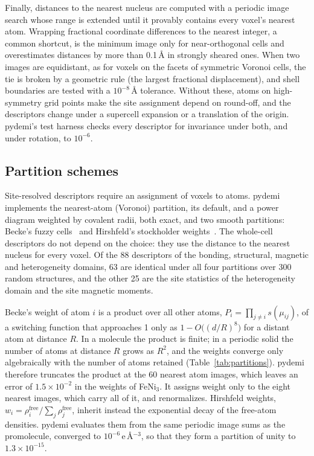 \documentclass[11pt,a4paper]{article}
\begin{document}
Finally, distances to the nearest nucleus are computed with a periodic image
search whose range is extended until it provably contains every voxel's
nearest atom. Wrapping fractional coordinate differences to the nearest
integer, a common shortcut, is the minimum image only for near-orthogonal
cells and overestimates distances by more than 0.1\,\AA{} in strongly sheared
ones. When two images are equidistant, as for voxels on the facets of
symmetric Voronoi cells, the tie is broken by a geometric rule (the largest
fractional displacement), and shell boundaries are tested with a
$10^{-8}$\,\AA{} tolerance. Without these, atoms on high-symmetry grid points
make the site assignment depend on round-off, and the descriptors change
under a supercell expansion or a translation of the origin. pydemi's test
harness checks every descriptor for invariance under both, and under
rotation, to $10^{-6}$.

\subsection{Partition schemes}
\label{sec:numerics:partitions}

Site-resolved descriptors require an assignment of voxels to atoms. pydemi
implements the nearest-atom (Voronoi) partition, its default, and a power
diagram weighted by covalent radii, both exact, and two smooth partitions:
Becke's fuzzy cells~\cite{becke1988} and Hirshfeld's stockholder
weights~\cite{hirshfeld1977}. The whole-cell descriptors do not depend on the
choice: they use the distance to the nearest nucleus for every voxel. Of the 88
descriptors of the bonding, structural, magnetic and heterogeneity domains, 63
are identical under all four partitions over 300 random structures, and the
other 25 are the site statistics of the heterogeneity domain and the site
magnetic moments.

Becke's weight of atom $i$ is a product over all other atoms,
$P_i=\prod_{j\neq i}s(\mu_{ij})$, of a switching function that approaches 1
only as $1-O\big((d/R)^8\big)$ for a distant atom at distance $R$. In a
molecule the product is finite; in a periodic solid the number of atoms at
distance $R$ grows as $R^2$, and the weights converge only algebraically with
the number of atoms retained (Table~\ref{tab:partitions}). pydemi therefore
truncates the product at the 60 nearest atom images, which leaves an error of
$1.5\times10^{-2}$ in the weights of FeNi$_3$. It assigns weight only to the
eight nearest images, which carry all of it, and renormalizes. Hirshfeld weights,
$w_i=\rho^{\mathrm{free}}_i/\sum_j\rho^{\mathrm{free}}_j$, inherit instead the
exponential decay of the free-atom densities. pydemi evaluates them from the
same periodic image sums as the promolecule, converged to
$10^{-6}$\,e\,\AA$^{-3}$, so that they form a partition of unity to
$1.3\times10^{-15}$.
\end{document}

